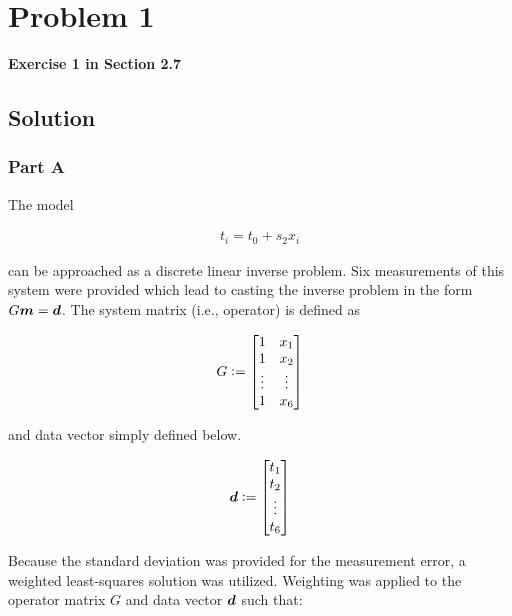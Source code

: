 
\begingroup
\allowdisplaybreaks

\newpage
\section{Problem 1}

\textbf{Exercise 1 in Section 2.7}

\subsection{Solution}
	
\subsubsection{Part A}

The model

\begin{align*}
	t_i = t_0 + s_2 x_i
\end{align*}

can be approached as a discrete linear inverse problem. Six measurements of this system were provided which lead to casting the inverse problem in the form $G\boldsymbol{m} = \boldsymbol{d}$. The system matrix (i.e., operator) is defined as

\begin{align*}
	G \vcentcolon= \begin{bmatrix} 1 & x_1 \\ 1 & x_2 \\ \vdots & \vdots \\ 1 & x_6 \end{bmatrix}
\end{align*}

and data vector simply defined below.

\begin{align*}
	\boldsymbol{d} \vcentcolon= \begin{bmatrix} t_1 \\ t_2 \\ \vdots \\ t_6 \end{bmatrix}
\end{align*}

Because the standard deviation was provided for the measurement error, a weighted least-squares solution was utilized. Weighting was applied to the operator matrix $G$ and data vector $\boldsymbol{d}$ such that:

